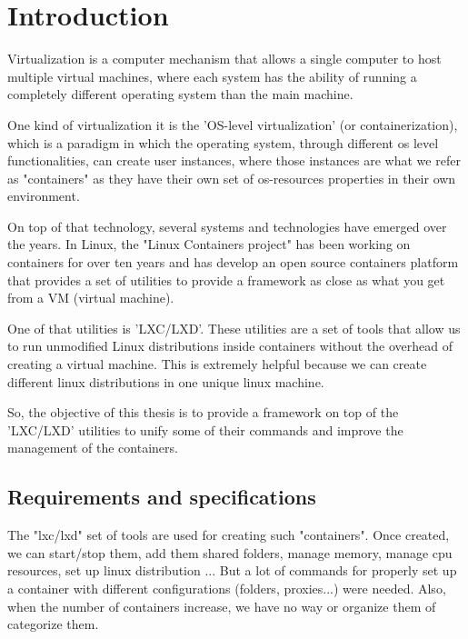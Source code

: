\clearpage\section{Introduction}

Virtualization is a computer mechanism that allows a single computer to host multiple virtual machines, where each system has the ability of running a completely different operating system than the main machine. 

One kind of virtualization it is the 'OS-level virtualization' (or containerization), which is a paradigm in which the operating system, through different os level functionalities, can create user instances, where those instances are what we refer as "containers" as they have their own set of os-resources properties in their own environment.

On top of that technology, several systems and technologies have emerged over the years. In Linux, the "Linux Containers project" has been working on containers for over ten years and has develop an open source containers platform that provides a set of utilities to provide a framework as close as what you get from a VM (virtual machine). 

One of that utilities is 'LXC/LXD'. These utilities are a set of tools that allow us to run unmodified Linux distributions inside containers without the overhead of creating a virtual machine. This is extremely helpful because we can create different linux distributions in one unique linux machine.

So, the objective of this thesis is to provide a framework on top of the 'LXC/LXD' utilities to unify some of their commands and improve the management of the containers.

\bigskip

\subsection{Requirements and specifications}
\label{ssec:requirements}
The "lxc/lxd" set of tools are used for creating such "containers". Once created, we can start/stop them, add them shared folders, manage memory, manage cpu resources, set up linux distribution ...
But a lot of commands for properly set up a container with different configurations (folders, proxies...) were needed. Also, when the number of containers increase, we have no way or organize them of categorize them.

